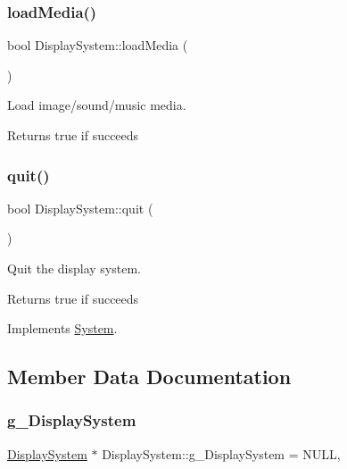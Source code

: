 \subsubsection{\texorpdfstring{load\+Media()}{loadMedia()}}
{\footnotesize\ttfamily bool Display\+System\+::load\+Media (\begin{DoxyParamCaption}{ }\end{DoxyParamCaption})}



Load image/sound/music media. 

\begin{DoxyReturn}{Returns}
true if succeeds 
\end{DoxyReturn}
\mbox{\label{class_display_system_ac39d9b8a2c9c50e60a1a84ed0e152bda}} 
\subsubsection{\texorpdfstring{quit()}{quit()}}
{\footnotesize\ttfamily bool Display\+System\+::quit (\begin{DoxyParamCaption}{ }\end{DoxyParamCaption})\hspace{0.3cm}{\ttfamily [virtual]}}



Quit the display system. 

\begin{DoxyReturn}{Returns}
true if succeeds 
\end{DoxyReturn}


Implements \mbox{\hyperlink{class_system_a85561f23cf200852888f337af183f9b7}{System}}.



\subsection{Member Data Documentation}
\mbox{\label{class_display_system_a62f8da3ad38782a017f6bb4c1fb0eed4}} 
\subsubsection{\texorpdfstring{g\+\_\+\+Display\+System}{g\_DisplaySystem}}
{\footnotesize\ttfamily \mbox{\hyperlink{class_display_system}{Display\+System}} $\ast$ Display\+System\+::g\+\_\+\+Display\+System = N\+U\+LL\hspace{0.3cm}{\ttfamily [static]}, {\ttfamily [private]}}

